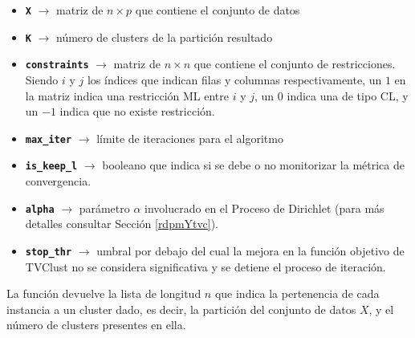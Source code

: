\begin{itemize}
	
	\item \textbf{\texttt{X}} {$\longrightarrow$ matriz de $n \times p$ que contiene el conjunto de datos}
	
	\item \textbf{\texttt{K}} {$\longrightarrow$ número de clusters de la partición resultado}
	
	\item \textbf{\texttt{constraints}} {$\longrightarrow$ matriz de $n \times n$ que contiene el conjunto de restricciones. Siendo $i$ y $j$ los índices que indican filas y columnas respectivamente, un $1$ en la matriz indica una restricción \acs{ML} entre $i$ y $j$, un $0$ indica una de tipo \acs{CL}, y un $-1$ indica que no existe restricción.}
	
	\item \textbf{\texttt{max\_iter}} {$\longrightarrow$ límite de iteraciones para el algoritmo}
	
	\item \textbf{\texttt{is\_keep\_l}} {$\longrightarrow$ booleano que indica si se debe o no monitorizar la métrica de convergencia.}
	
	\item \textbf{\texttt{alpha}} {$\longrightarrow$ parámetro $\alpha$ involucrado en el Proceso de Dirichlet (para más detalles consultar Sección \ref{rdpmYtvc}).}
	
	\item \textbf{\texttt{stop\_thr}} {$\longrightarrow$ umbral por debajo del cual la mejora en la función objetivo de \acs{TVClust} no se considera significativa y se detiene el proceso de iteración.}
	
\end{itemize}

La función devuelve la lista de longitud $n$ que indica la pertenencia de cada instancia a un cluster dado, es decir, la partición del conjunto de datos $X$, y el número de clusters presentes en ella.








